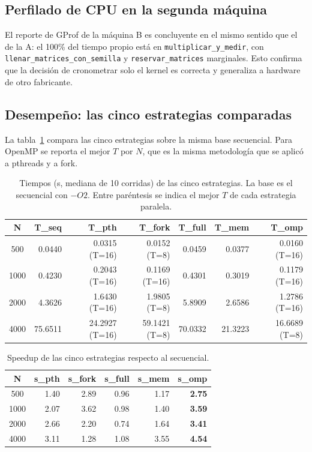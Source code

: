 \subsection{Perfilado de CPU en la segunda máquina}

El reporte de GProf de la máquina B es concluyente en el mismo sentido que el de la A: el 100\% del tiempo propio está en \texttt{multiplicar\_y\_medir}, con \texttt{llenar\_matrices\_con\_semilla} y \texttt{reservar\_matrices} marginales. Esto confirma que la decisión de cronometrar solo el kernel es correcta y generaliza a hardware de otro fabricante.

\subsection{Desempeño: las cinco estrategias comparadas}

La tabla~\ref{tab:cinco-estrategias} compara las cinco estrategias sobre la misma base secuencial. Para OpenMP se reporta el mejor $T$ por $N$, que es la misma metodología que se aplicó a pthreads y a fork.

\begin{table}[ht]
\centering
\small
\begin{tabular}{|c|r|r|r|r|r|r|}
\hline
\textbf{N} & \textbf{T\_seq} & \textbf{T\_pth} & \textbf{T\_fork} & \textbf{T\_full} & \textbf{T\_mem} & \textbf{T\_omp} \\
\hline
500  & 0.0440 & 0.0315 (T=16) & 0.0152 (T=8) & 0.0459 & 0.0377 & 0.0160 (T=16) \\
1000 & 0.4230 & 0.2043 (T=16) & 0.1169 (T=16) & 0.4301 & 0.3019 & 0.1179 (T=16) \\
2000 & 4.3626 & 1.6430 (T=16) & 1.9805 (T=8) & 5.8909 & 2.6586 & 1.2786 (T=16) \\
4000 & 75.6511 & 24.2927 (T=16) & 59.1421 (T=8) & 70.0332 & 21.3223 & 16.6689 (T=8) \\
\hline
\end{tabular}
\caption{Tiempos (s, mediana de 10 corridas) de las cinco estrategias. La base es el secuencial con $-O2$. Entre paréntesis se indica el mejor $T$ de cada estrategia paralela.}
\label{tab:cinco-estrategias}
\end{table}

\begin{table}[ht]
\centering
\small
\begin{tabular}{|c|r|r|r|r|r|}
\hline
\textbf{N} & \textbf{s\_pth} & \textbf{s\_fork} & \textbf{s\_full} & \textbf{s\_mem} & \textbf{s\_omp} \\
\hline
500  & 1.40 & 2.89 & 0.96 & 1.17 & \textbf{2.75} \\
1000 & 2.07 & 3.62 & 0.98 & 1.40 & \textbf{3.59} \\
2000 & 2.66 & 2.20 & 0.74 & 1.64 & \textbf{3.41} \\
4000 & 3.11 & 1.28 & 1.08 & 3.55 & \textbf{4.54} \\
\hline
\end{tabular}
\caption{Speedup de las cinco estrategias respecto al secuencial.}
\label{tab:speedups}
\end{table}

